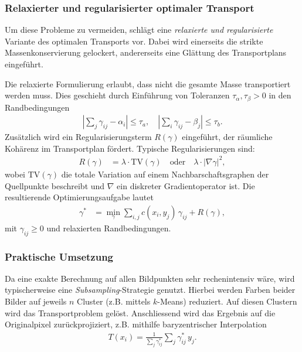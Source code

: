 \subsubsection{Relaxierter und regularisierter optimaler Transport}
Um diese Probleme zu vermeiden,
schlägt \cite{mongekant:color} eine \emph{relaxierte und regularisierte}
Variante des optimalen Transports vor.
Dabei wird einerseits die strikte Massenkonservierung gelockert,
andererseits eine Glättung des Transportplans eingeführt.

Die relaxierte Formulierung erlaubt,
dass nicht die gesamte Masse transportiert werden muss.
Dies geschieht durch Einführung von Toleranzen $\tau_\alpha, \tau_\beta > 0$
in den Randbedingungen
\begin{align*}
\left| \sum_{j} \gamma_{ij} - \alpha_i \right|
\leq
\tau_a
, \quad
\left| \sum_{i} \gamma_{ij} - \beta_j \right|
\leq
\tau_b.
\end{align*}
Zusätzlich wird ein Regularisierungsterm $R(\gamma)$ eingeführt,
der räumliche Kohärenz im Transportplan fördert.
Typische Regularisierungen sind:
\begin{align*}
R(\gamma)
&=
\lambda \cdot \mathrm{TV}(\gamma)
\quad \text{oder} \quad
\lambda \cdot |\nabla \gamma|^2,
\end{align*}
wobei $\mathrm{TV}(\gamma)$ die totale Variation \cite{mongekant:totvar}
auf einem Nachbarschaftsgraphen der Quellpunkte beschreibt
und $\nabla$ ein diskreter Gradientoperator ist.
Die resultierende Optimierungsaufgabe lautet
\begin{align*}
\gamma^\ast
&=
\min_{\gamma} \sum_{i,j} c(x_i, y_j)\, \gamma_{ij} + R(\gamma),
\end{align*}
mit $\gamma_{ij} \geq 0$ und relaxierten Randbedingungen.

\subsubsection{Praktische Umsetzung}
Da eine exakte Berechnung auf allen Bildpunkten sehr rechenintensiv wäre,
wird typischerweise eine \emph{Subsampling}-Strategie genutzt.
Hierbei werden Farben beider Bilder auf jeweils $n$ Cluster
(z.B. mittels $k$-Means) reduziert.
Auf diesen Clustern wird das Transportproblem gelöst.
Anschliessend wird das Ergebnis auf die Originalpixel zurückprojiziert,
z.B. mithilfe baryzentrischer Interpolation
\begin{align*}
T(x_i)
=
\frac{1}{\sum_j \gamma^\ast_{ij}} \sum_j \gamma^\ast_{ij} \, y_j.
\end{align*}

